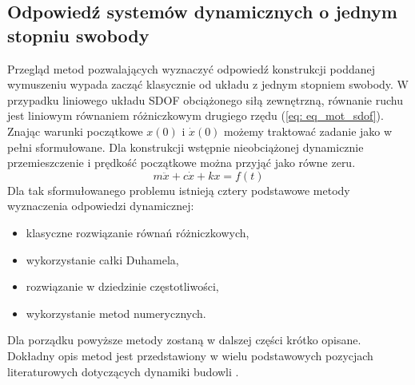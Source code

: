 
\subsection{Odpowiedź systemów dynamicznych o jednym stopniu swobody} \label{section: sdof_response}

Przegląd metod pozwalających wyznaczyć odpowiedź konstrukcji poddanej wymuszeniu wypada zacząć klasycznie od układu z jednym stopniem swobody. W przypadku liniowego układu SDOF obciążonego siłą zewnętrzną, równanie ruchu jest liniowym równaniem różniczkowym drugiego rzędu (\ref{eq: eq_mot_sdof}). Znając warunki początkowe $x(0)$ i $\dot{x}(0)$ możemy traktować zadanie jako w pełni sformułowane. Dla konstrukcji wstępnie nieobciążonej dynamicznie przemieszczenie i prędkość początkowe można przyjąć jako równe zeru.
\begin{equation} \label{eq: eq_mot_sdof}
	m\ddot{x}+c\dot{x}+k{x}=f(t)
\end{equation}
Dla tak sformułowanego problemu istnieją cztery podstawowe metody wyznaczenia odpowiedzi dynamicznej:
\begin{itemize}[noitemsep]
	\item klasyczne rozwiązanie równań różniczkowych,
	\item wykorzystanie całki Duhamela,
	\item rozwiązanie w dziedzinie częstotliwości,
	\item wykorzystanie metod numerycznych.
\end{itemize}
Dla porządku powyższe metody zostaną w dalszej części krótko opisane. Dokładny opis metod jest przedstawiony w wielu podstawowych pozycjach literaturowych dotyczących dynamiki budowli \parencite{Clough1975,Chmielewski1998,Chopra2012a}.

